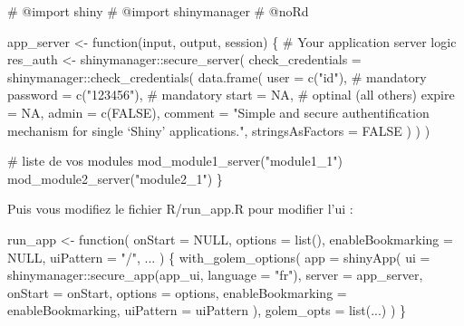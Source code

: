 \documentclass[
  letterpaper,
  DIV=11,
  numbers=noendperiod]{scrreprt}
\newenvironment{Shaded}{\begin{snugshade}}{\end{snugshade}}
\newcommand{\AttributeTok}[1]{\textcolor[rgb]{0.40,0.45,0.13}{#1}}
\newcommand{\CommentTok}[1]{\textcolor[rgb]{0.37,0.37,0.37}{#1}}
\newcommand{\ConstantTok}[1]{\textcolor[rgb]{0.56,0.35,0.01}{#1}}
\newcommand{\ControlFlowTok}[1]{\textcolor[rgb]{0.00,0.23,0.31}{#1}}
\newcommand{\FunctionTok}[1]{\textcolor[rgb]{0.28,0.35,0.67}{#1}}
\newcommand{\NormalTok}[1]{\textcolor[rgb]{0.00,0.23,0.31}{#1}}
\newcommand{\OtherTok}[1]{\textcolor[rgb]{0.00,0.23,0.31}{#1}}
\newcommand{\SpecialCharTok}[1]{\textcolor[rgb]{0.37,0.37,0.37}{#1}}
\newcommand{\StringTok}[1]{\textcolor[rgb]{0.13,0.47,0.30}{#1}}
\begin{document}
\begin{Shaded}
\begin{Highlighting}[]
\CommentTok{\#\textquotesingle{} @import shiny}
\CommentTok{\#\textquotesingle{} @import shinymanager}
\CommentTok{\#\textquotesingle{} @noRd}

\NormalTok{app\_server }\OtherTok{\textless{}{-}} \ControlFlowTok{function}\NormalTok{(input, output, session) \{}
  \CommentTok{\# Your application server logic}
\NormalTok{  res\_auth }\OtherTok{\textless{}{-}}\NormalTok{ shinymanager}\SpecialCharTok{::}\FunctionTok{secure\_server}\NormalTok{(}
    \AttributeTok{check\_credentials =}\NormalTok{ shinymanager}\SpecialCharTok{::}\FunctionTok{check\_credentials}\NormalTok{(}
      \FunctionTok{data.frame}\NormalTok{(}
        \AttributeTok{user =} \FunctionTok{c}\NormalTok{(}\StringTok{"id"}\NormalTok{), }\CommentTok{\# mandatory}
        \AttributeTok{password =} \FunctionTok{c}\NormalTok{(}\StringTok{"123456"}\NormalTok{), }\CommentTok{\# mandatory}
        \AttributeTok{start =} \ConstantTok{NA}\NormalTok{, }\CommentTok{\# optinal (all others)}
        \AttributeTok{expire =} \ConstantTok{NA}\NormalTok{,}
        \AttributeTok{admin =} \FunctionTok{c}\NormalTok{(}\ConstantTok{FALSE}\NormalTok{),}
        \AttributeTok{comment =} \StringTok{"Simple and secure authentification mechanism}
\StringTok{  for single ‘Shiny’ applications."}\NormalTok{,}
        \AttributeTok{stringsAsFactors =} \ConstantTok{FALSE}
\NormalTok{      )}
\NormalTok{    )}
\NormalTok{  )}

  \CommentTok{\# liste de vos modules}
  \FunctionTok{mod\_module1\_server}\NormalTok{(}\StringTok{"module1\_1"}\NormalTok{)}
  \FunctionTok{mod\_module2\_server}\NormalTok{(}\StringTok{"module2\_1"}\NormalTok{)}
\NormalTok{\}}
\end{Highlighting}
\end{Shaded}

Puis vous modifiez le fichier R/run\_app.R pour modifier l'ui :

\begin{Shaded}
\begin{Highlighting}[]
\NormalTok{run\_app }\OtherTok{\textless{}{-}} \ControlFlowTok{function}\NormalTok{(}
  \AttributeTok{onStart =} \ConstantTok{NULL}\NormalTok{,}
  \AttributeTok{options =} \FunctionTok{list}\NormalTok{(),}
  \AttributeTok{enableBookmarking =} \ConstantTok{NULL}\NormalTok{,}
  \AttributeTok{uiPattern =} \StringTok{"/"}\NormalTok{,}
\NormalTok{  ...}
\NormalTok{) \{}
  \FunctionTok{with\_golem\_options}\NormalTok{(}
    \AttributeTok{app =} \FunctionTok{shinyApp}\NormalTok{(}
      \AttributeTok{ui =}\NormalTok{ shinymanager}\SpecialCharTok{::}\FunctionTok{secure\_app}\NormalTok{(app\_ui, }\AttributeTok{language =} \StringTok{"fr"}\NormalTok{),}
      \AttributeTok{server =}\NormalTok{ app\_server,}
      \AttributeTok{onStart =}\NormalTok{ onStart,}
      \AttributeTok{options =}\NormalTok{ options,}
      \AttributeTok{enableBookmarking =}\NormalTok{ enableBookmarking,}
      \AttributeTok{uiPattern =}\NormalTok{ uiPattern}
\NormalTok{    ),}
    \AttributeTok{golem\_opts =} \FunctionTok{list}\NormalTok{(...)}
\NormalTok{  )}
\NormalTok{\}}
\end{Highlighting}
\end{Shaded}
\end{document}
